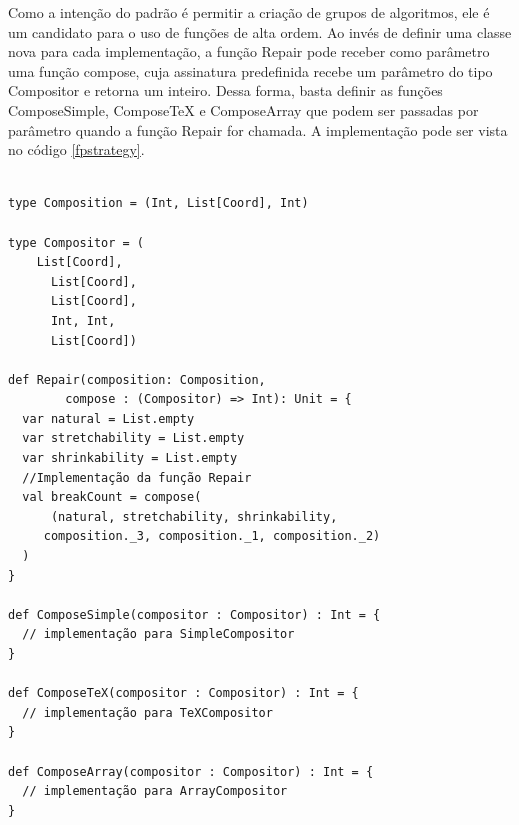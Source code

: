Como a intenção do padrão é permitir a criação de 
grupos de algoritmos, ele é um candidato para o uso 
de funções de alta ordem. Ao invés de definir 
uma classe nova para cada implementação, a 
função Repair pode receber como parâmetro uma 
função compose, cuja assinatura predefinida 
recebe um parâmetro do tipo Compositor e retorna 
um inteiro. Dessa forma, basta definir as 
funções ComposeSimple, ComposeTeX e ComposeArray 
que podem ser passadas por parâmetro quando a 
função Repair for chamada. A implementação pode 
ser vista no código \ref{fpstrategy}.

\begin{lstlisting}[caption={Strategy Funcional},label=fpstrategy]
    
type Composition = (Int, List[Coord], Int)

type Compositor = (
    List[Coord],
      List[Coord],
      List[Coord],
      Int, Int,
      List[Coord])

def Repair(composition: Composition,
        compose : (Compositor) => Int): Unit = {
  var natural = List.empty
  var stretchability = List.empty
  var shrinkability = List.empty
  //Implementação da função Repair
  val breakCount = compose(
      (natural, stretchability, shrinkability,
     composition._3, composition._1, composition._2)
  )
}

def ComposeSimple(compositor : Compositor) : Int = {
  // implementação para SimpleCompositor
}

def ComposeTeX(compositor : Compositor) : Int = {
  // implementação para TeXCompositor
}

def ComposeArray(compositor : Compositor) : Int = {
  // implementação para ArrayCompositor
}
    
\end{lstlisting}

